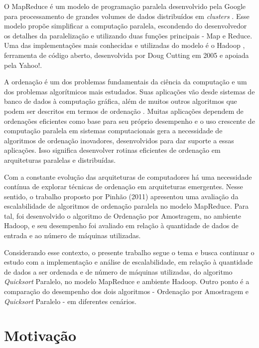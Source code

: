 O MapReduce é um modelo de programação paralela desenvolvido pela Google para processamento de grandes volumes de dados distribuídos em \textit{clusters} \cite{Dean:2008}. Esse modelo propõe simplificar a computação paralela, escondendo  do desenvolvedor os detalhes da paralelização e utilizando duas funções principais - Map e Reduce.
Uma das implementações mais conhecidas e utilizadas do modelo é o Hadoop \cite{White:2009}, ferramenta de código aberto, desenvolvida por Doug Cutting em 2005 e apoiada pela Yahoo!. 

 A ordenação é um dos problemas fundamentais da ciência da computação e um dos problemas algorítmicos mais estudados. Suas aplicações vão desde sistemas de banco de dados à computação gráfica, além de muitos outros algoritmos que podem ser descritos em termos de ordenação \cite{Satish:2009,Amato:1996}.  Muitas aplicações dependem de ordenações eficientes como base para seu próprio desempenho e o uso crescente de computação paralela em sistemas computacionais gera a necessidade de algoritmos de ordenação inovadores, desenvolvidos para dar suporte a essas aplicações. Isso significa desenvolver rotinas eficientes de ordenação em arquiteturas paralelas e distribuídas. 
 

Com a constante evolução das arquiteturas de computadores há uma necessidade contínua de explorar técnicas de ordenação em arquiteturas emergentes. Nesse sentido, o trabalho proposto por %
Pinhão (2011) apresentou uma avaliação da escalabilidade 
de algoritmos de ordenação paralela no modelo MapReduce. Para tal, foi desenvolvido o algoritmo de Ordenação por Amostragem, no ambiente Hadoop, e seu desempenho foi avaliado em relação à quantidade de dados de entrada e ao número de máquinas utilizadas. 

Considerando esse contexto, o presente trabalho segue o tema e busca continuar o estudo com a implementação e análise de escalabilidade, em relação à quantidade de dados a ser ordenada e de número de máquinas utilizadas, do algoritmo \textit{Quicksort} Paralelo, no modelo MapReduce e ambiente Hadoop. Outro ponto é a comparação do desempenho dos dois algoritmos - Ordenação por Amostragem e \textit{Quicksort} Paralelo - em diferentes cenários.


\section{Motivação}


